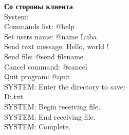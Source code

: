 \documentclass[12pt,a4paper]{article}
\begin{document}
\Large{\bf Со стороны клиента }
\\System:
\\Commands list: @help
\\Set users name: @name Luba
\\Send text message: Hello, world !
\\Send file: @send filename
\\Cancel command: @cancel
\\Quit program: @quit
\\SYSTEM: Enter the directory to save:
\\D:\textmessage.txt
\\SYSTEM: Begin receiving file.
\\[\#\#\#\#\#.......]
SYSTEM: End receiving file.
\\SYSTEM: Complete.
\end{document}
